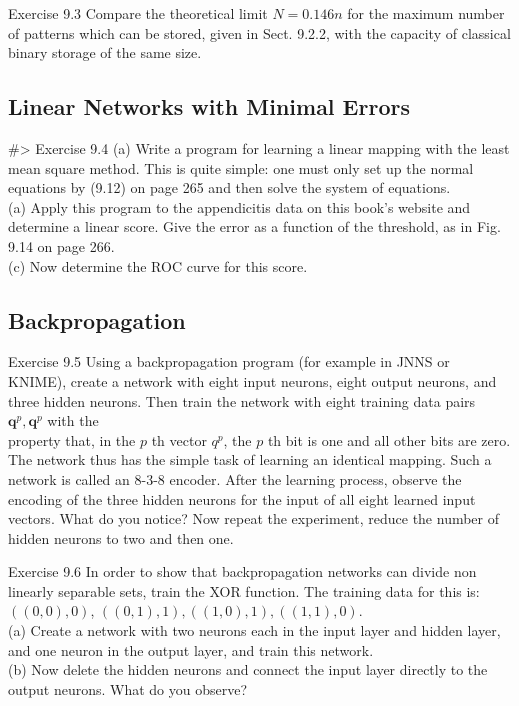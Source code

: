 \documentclass[10pt]{book}
\begin{document}
Exercise 9.3 Compare the theoretical limit $N=0.146 n$ for the maximum number of patterns which can be stored, given in Sect. 9.2.2, with the capacity of classical binary storage of the same size.

\subsection{Linear Networks with Minimal Errors}
\#> Exercise 9.4
(a) Write a program for learning a linear mapping with the least mean square method. This is quite simple: one must only set up the normal equations by (9.12) on page 265 and then solve the system of equations.\\
(a) Apply this program to the appendicitis data on this book's website and determine a linear score. Give the error as a function of the threshold, as in Fig. 9.14 on page 266.\\
(c) Now determine the ROC curve for this score.

\subsection{Backpropagation}
Exercise 9.5 Using a backpropagation program (for example in JNNS or KNIME), create a network with eight input neurons, eight output neurons, and three hidden neurons. Then train the network with eight training data pairs $\boldsymbol{q}^{p}, \boldsymbol{q}^{p}$ with the\\
property that, in the $p$ th vector $q^{p}$, the $p$ th bit is one and all other bits are zero. The network thus has the simple task of learning an identical mapping. Such a network is called an 8-3-8 encoder. After the learning process, observe the encoding of the three hidden neurons for the input of all eight learned input vectors. What do you notice? Now repeat the experiment, reduce the number of hidden neurons to two and then one.


Exercise 9.6 In order to show that backpropagation networks can divide non linearly separable sets, train the XOR function. The training data for this is: $((0,0), 0)$, $((0,1), 1),((1,0), 1),((1,1), 0)$.\\
(a) Create a network with two neurons each in the input layer and hidden layer, and one neuron in the output layer, and train this network.\\
(b) Now delete the hidden neurons and connect the input layer directly to the output neurons. What do you observe?
\end{document}
